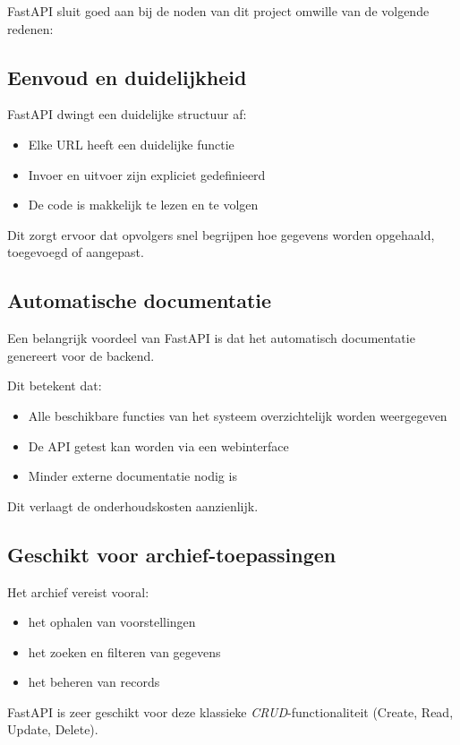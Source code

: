 \documentclass[11pt,a4paper]{article}
\begin{document}
FastAPI sluit goed aan bij de noden van dit project omwille van de volgende redenen:

\subsection{Eenvoud en duidelijkheid}

FastAPI dwingt een duidelijke structuur af:
\begin{itemize}
  \item Elke URL heeft een duidelijke functie
  \item Invoer en uitvoer zijn expliciet gedefinieerd
  \item De code is makkelijk te lezen en te volgen
\end{itemize}

Dit zorgt ervoor dat opvolgers snel begrijpen hoe gegevens worden opgehaald, toegevoegd of aangepast.

\subsection{Automatische documentatie}

Een belangrijk voordeel van FastAPI is dat het automatisch documentatie genereert voor de backend.

Dit betekent dat:
\begin{itemize}
  \item Alle beschikbare functies van het systeem overzichtelijk worden weergegeven
  \item De API getest kan worden via een webinterface
  \item Minder externe documentatie nodig is
\end{itemize}

Dit verlaagt de onderhoudskosten aanzienlijk.

\subsection{Geschikt voor archief-toepassingen}

Het archief vereist vooral:
\begin{itemize}
  \item het ophalen van voorstellingen
  \item het zoeken en filteren van gegevens
  \item het beheren van records
\end{itemize}

FastAPI is zeer geschikt voor deze klassieke \emph{CRUD}-functionaliteit (Create, Read, Update, Delete).
\end{document}
